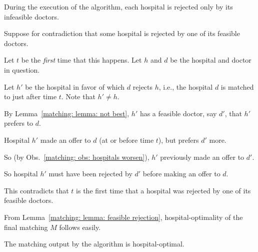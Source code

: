 \documentclass[11pt]{article}
\begin{document}
\begin{lemma}\label{matching: lemma: feasible rejection}  During the execution of the algorithm,
  each hospital is rejected only by its infeasible doctors.
\end{lemma}
\begin{longFormProof}
    \step Suppose for contradiction that some hospital is rejected by one of its feasible doctors.

    \step Let $t$ be the \emph{first} time that this happens.
    Let $h$ and $d$ be the hospital and doctor in question.

    \step Let $h'$ be the hospital in favor of which $d$ rejects $h$, i.e., the hospital $d$ is matched to just after time $t$.    Note that $h' \ne h$.

    \step By Lemma~\ref{matching: lemma: not best}, $h'$ has a feasible doctor, say $d'$, that $h'$ prefers to $d$.

    \step Hospital $h'$ made an offer to $d$ (at or before time $t$), but prefers $d'$ more.

    \step So  (by Obs.~\ref{matching: obs: hospitals worsen}), $h'$ previously made an offer to $d'$.

    \step So hospital $h'$ must have been rejected by $d'$ before making an offer to $d$.

    \step This contradicts that $t$ is the first time that a hospital was rejected by one of its feasible doctors.
\end{longFormProof}

\newpage


From Lemma~\ref{matching: lemma: feasible rejection}, hospital-optimality of the final matching $M$ follows easily.

\begin{lemma}\label{matching: lemma: hospital optimal}
  The matching output by the algorithm is hospital-optimal.
\end{lemma}
\end{document}

